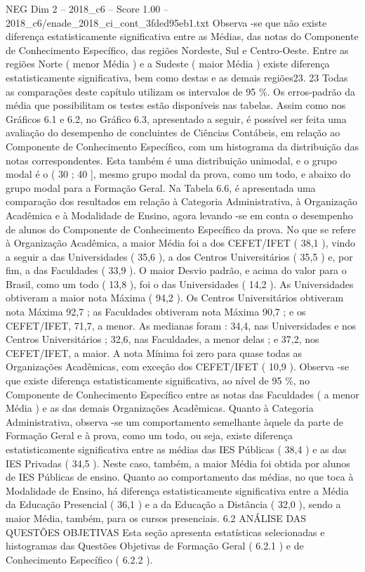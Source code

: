 \begin{textsample}{NEG Dim 2 – 2018\_c6 – Score 1.00 – 2018\_c6/enade\_2018\_ci\_cont\_3fded95eb1.txt}
Observa -se que não existe diferença estatisticamente significativa entre as Médias, das notas do Componente de Conhecimento Específico, das regiões Nordeste, Sul e Centro-Oeste.
Entre as regiões Norte ( menor Média ) e a Sudeste ( maior Média ) existe diferença estatisticamente significativa, bem como destas e as demais regiões23. 23 Todas as comparações deste capítulo utilizam os intervalos de 95 \%.
Os erros-padrão da média que possibilitam os testes estão disponíveis nas tabelas.
Assim como nos Gráficos 6.1 e 6.2, no Gráfico 6.3, apresentado a seguir, é possível ser feita uma avaliação do desempenho de concluintes de Ciências Contábeis, em relação ao Componente de Conhecimento Específico, com um histograma da distribuição das notas correspondentes.
Esta também é uma distribuição unimodal, e o grupo modal é o ( 30 ; 40 ], mesmo grupo modal da prova, como um todo, e abaixo do grupo modal para a Formação Geral.
Na Tabela 6.6, é apresentada uma comparação dos resultados em relação à Categoria Administrativa, à Organização Acadêmica e à Modalidade de Ensino, agora levando -se em conta o desempenho de alunos do Componente de Conhecimento Específico da prova.
No que se refere à Organização Acadêmica, a maior Média foi a dos CEFET/IFET ( 38,1 ), vindo a seguir a das Universidades ( 35,6 ), a dos Centros Universitários ( 35,5 ) e, por fim, a das Faculdades ( 33,9 ).
O maior Desvio padrão, e acima do valor para o Brasil, como um todo ( 13,8 ), foi o das Universidades ( 14,2 ).
As Universidades obtiveram a maior nota Máxima ( 94,2 ).
Os Centros Universitários obtiveram nota Máxima 92,7 ; as Faculdades obtiveram nota Máxima 90,7 ; e os CEFET/IFET, 71,7, a menor.
As medianas foram : 34,4, nas Universidades e nos Centros Universitários ; 32,6, nas Faculdades, a menor delas ; e 37,2, nos CEFET/IFET, a maior.
A nota Mínima foi zero para quase todas as Organizações Acadêmicas, com exceção dos CEFET/IFET ( 10,9 ).
Observa -se que existe diferença estatisticamente significativa, ao nível de 95 \%, no Componente de Conhecimento Específico entre as notas das Faculdades ( a menor Média ) e as das demais Organizações Acadêmicas.
Quanto à Categoria Administrativa, observa -se um comportamento semelhante àquele da parte de Formação Geral e à prova, como um todo, ou seja, existe diferença estatisticamente significativa entre as médias das IES Públicas ( 38,4 ) e as das IES Privadas ( 34,5 ).
Neste caso, também, a maior Média foi obtida por alunos de IES Públicas de ensino.
Quanto ao comportamento das médias, no que toca à Modalidade de Ensino, há diferença estatisticamente significativa entre a Média da Educação Presencial ( 36,1 ) e a da Educação a Distância ( 32,0 ), sendo a maior Média, também, para os cursos presenciais. 6.2 ANÁLISE DAS QUESTÕES OBJETIVAS Esta seção apresenta estatísticas selecionadas e histogramas das Questões Objetivas de Formação Geral ( 6.2.1 ) e de Conhecimento Específico ( 6.2.2 ).

\end{textsample}
